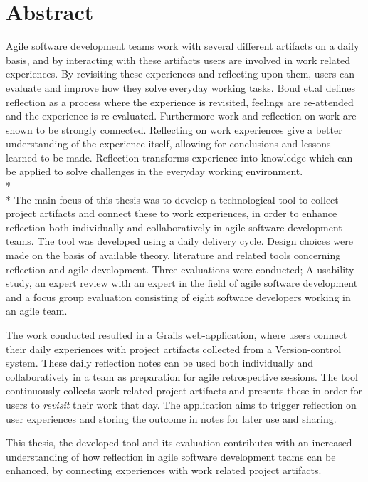 \section*{Abstract}
Agile software development teams work with several different artifacts on a daily basis, and by interacting with these artifacts users are involved in work related experiences. By revisiting these experiences and reflecting upon them, users can evaluate and improve how they solve everyday working tasks. Boud et.al defines reflection as a process where the experience is revisited, feelings are re-attended and the experience is re-evaluated\citep{boudreflection1985}. 
Furthermore work and reflection on work are shown to be strongly connected\citep{Schon1983}\citep{Chaiklin1993}. Reflecting on work experiences give a better understanding of the experience itself, allowing for conclusions and lessons learned to be made. 
Reflection transforms experience into knowledge which can be applied to solve challenges in the everyday working environment. \\*
\\*
The main focus of this thesis was to develop a technological tool to collect project artifacts and connect these to work experiences, in order to enhance reflection both individually and collaboratively in agile software development teams.
The tool was developed using a daily delivery cycle. Design choices were made on the basis of available theory, literature and related tools concerning reflection and agile development. Three evaluations were conducted; A usability study, an expert review with an expert in the field of agile software development and a focus group evaluation consisting of eight software developers working in an agile team. 

The work conducted resulted in a Grails web-application, where users connect their daily experiences with project artifacts collected from a Version-control system. These daily reflection notes can be used both individually and collaboratively in a team as preparation for agile retrospective sessions. The tool continuously collects work-related project artifacts and presents these in order for users to \emph{revisit} their work that day. The application aims to trigger reflection on user experiences and storing the outcome in notes for later use and sharing.

This thesis, the developed tool and its evaluation contributes with an increased understanding of how reflection in agile software development teams can be enhanced, by connecting experiences with work related project artifacts. 

\newpage